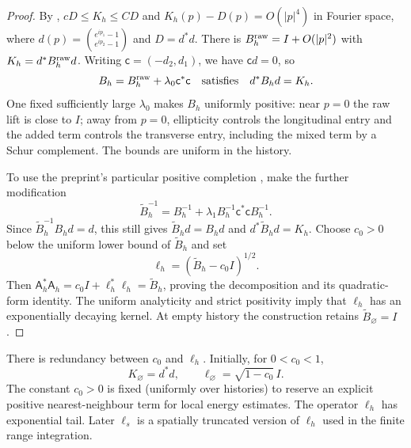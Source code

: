 \documentclass[11pt]{article}
\newcommand{\Id}{I}
\numberwithin{equation}{section}
\theoremstyle{definition}
\theoremstyle{plain}
\begin{document}
\begin{proof}
By \cite[Section~4.2]{OpenAI-O3}, $cD\le K_h\le CD$ and $K_h(p)-D(p)=O(|p|^4)$ in Fourier space, where
$d(p)=\binom{e^{ip_1}-1}{e^{ip_2}-1}$ and $D=d^*d$.
There is $B_h^{\rm raw}=I+O(|p|^2)$ with $K_h=d^*B_h^{\rm raw}d$.
Writing $\mathsf c=(-d_2,d_1)$, we have $\mathsf c d=0$, so
\begin{equation}
 B_h=B_h^{\rm raw}+\lambda_0\mathsf c^*\mathsf c
 \quad\text{satisfies}\quad d^*B_hd=K_h.
\end{equation}
One fixed sufficiently large $\lambda_0$ makes $B_h$ uniformly
positive: near $p=0$ the raw lift is close to $I$; away from $p=0$,
ellipticity controls the longitudinal entry and the added term
controls the transverse entry, including the mixed term by a Schur
complement.  The bounds are uniform in the history.

To use the preprint's particular positive completion \cite[Section~4.3]{OpenAI-O3},
make the further modification
\begin{equation}
 \widetilde B_h^{-1}
 =B_h^{-1}+\lambda_1 B_h^{-1}\mathsf c^*\mathsf c B_h^{-1}.
\end{equation}
Since $\widetilde B_h^{-1}B_hd=d$, this still gives
$\widetilde B_hd=B_hd$ and $d^*\widetilde B_hd=K_h$.
Choose $c_0>0$ below the uniform lower bound of $\widetilde B_h$ and set
\begin{equation}
 \ell_h=(\widetilde B_h-c_0I)^{1/2}.
\end{equation}
Then $\mathsf A_h^*\mathsf A_h=c_0I+\ell_h^*\ell_h
=\widetilde B_h$, proving the decomposition and its quadratic-form
identity.  The uniform analyticity and strict positivity imply that
$\ell_h$ has an exponentially decaying kernel.  At empty history the
construction retains $\widetilde B_{\varnothing}=I$.
\end{proof}
There is redundancy between $c_0$ and $\ell_h$.
Initially, for $0<c_0<1$,
\begin{equation}
 K_{\varnothing}=d^*d,
 \qquad \ell_{\varnothing}=\sqrt{1-c_0}\,\Id.
\end{equation}
%
The constant $c_0>0$ is fixed (uniformly over histories) to reserve an explicit positive nearest-neighbour term for local energy estimates.
The operator $\ell_h$ has exponential tail.
Later $\ell_s$ is a spatially truncated version of $\ell_h$ used in the finite range integration.
\end{document}
